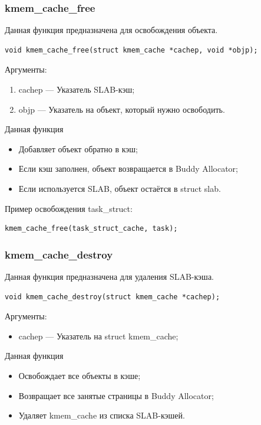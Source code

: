 \subsubsection*{kmem\_cache\_free}

Данная функция предназначена для освобождения объекта.

\begin{lstlisting}
void kmem_cache_free(struct kmem_cache *cachep, void *objp);
\end{lstlisting}

Аргументы:
\begin{enumerate}
    \item cachep --- Указатель SLAB-кэш;
    \item objp --- Указатель на объект, который нужно освободить.
\end{enumerate}

Данная функция
\begin{itemize}
    \item Добавляет объект обратно в кэш;
    \item Если кэш заполнен, объект возвращается в Buddy Allocator;
    \item Если используется SLAB, объект остаётся в struct slab.
\end{itemize}

Пример освобождения task\_struct:

\begin{lstlisting}
kmem_cache_free(task_struct_cache, task);
\end{lstlisting}

\subsubsection*{kmem\_cache\_destroy}

Данная функция предназначена для удаления SLAB-кэша.

\begin{lstlisting}
void kmem_cache_destroy(struct kmem_cache *cachep);
\end{lstlisting}

Аргументы:
\begin{itemize}
    \item cachep --- Указатель на struct kmem\_cache;
\end{itemize}

Данная функция
\begin{itemize}
    \item Освобождает все объекты в кэше;
    \item Возвращает все занятые страницы в Buddy Allocator;
    \item Удаляет kmem\_cache из списка SLAB-кэшей.
\end{itemize}

